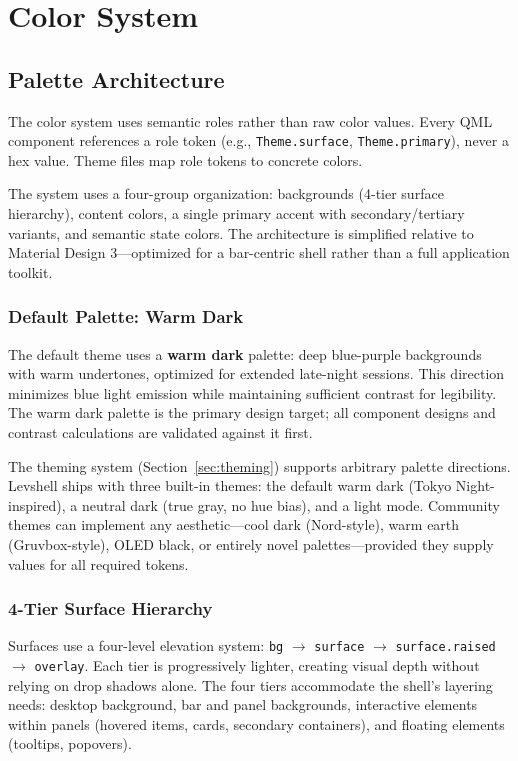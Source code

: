 \documentclass[11pt,a4paper]{article}
\begin{document}
\section{Color System}
\label{sec:color}

\subsection{Palette Architecture}

The color system uses semantic roles rather than raw color values. Every QML component references a role token (e.g., \texttt{Theme.surface}, \texttt{Theme.primary}), never a hex value. Theme files map role tokens to concrete colors.

The system uses a four-group organization: backgrounds (4-tier surface hierarchy), content colors, a single primary accent with secondary/tertiary variants, and semantic state colors. The architecture is simplified relative to Material Design 3---optimized for a bar-centric shell rather than a full application toolkit.

\subsubsection{Default Palette: Warm Dark}

The default theme uses a \textbf{warm dark} palette: deep blue-purple backgrounds with warm undertones, optimized for extended late-night sessions. This direction minimizes blue light emission while maintaining sufficient contrast for legibility. The warm dark palette is the primary design target; all component designs and contrast calculations are validated against it first.

The theming system (Section~\ref{sec:theming}) supports arbitrary palette directions. Levshell ships with three built-in themes: the default warm dark (Tokyo Night-inspired), a neutral dark (true gray, no hue bias), and a light mode. Community themes can implement any aesthetic---cool dark (Nord-style), warm earth (Gruvbox-style), OLED black, or entirely novel palettes---provided they supply values for all required tokens.

\subsubsection{4-Tier Surface Hierarchy}

Surfaces use a four-level elevation system: \texttt{bg} $\to$ \texttt{surface} $\to$ \texttt{surface.raised} $\to$ \texttt{overlay}. Each tier is progressively lighter, creating visual depth without relying on drop shadows alone. The four tiers accommodate the shell's layering needs: desktop background, bar and panel backgrounds, interactive elements within panels (hovered items, cards, secondary containers), and floating elements (tooltips, popovers).
\end{document}

